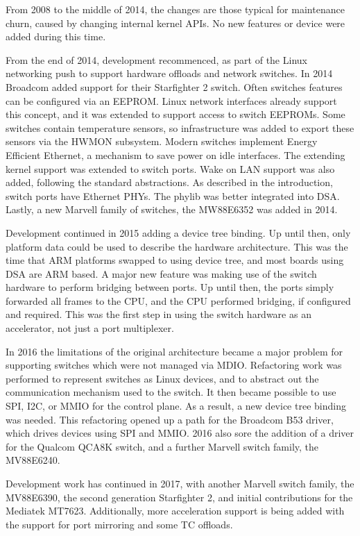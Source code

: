 \documentclass[letterpaper]{article}
\begin{document}
From 2008 to the middle of 2014, the changes are those typical for
maintenance churn, caused by changing internal kernel APIs. No new
features or device were added during this time.

From the end of 2014, development recommenced, as part of the Linux
networking push to support hardware offloads and network switches. In
2014 Broadcom added support for their Starfighter 2 switch. Often
switches features can be configured via an EEPROM. Linux network
interfaces already support this concept, and it was extended to
support access to switch EEPROMs. Some switches contain temperature
sensors, so infrastructure was added to export these sensors via the
HWMON subsystem. Modern switches implement Energy Efficient Ethernet,
a mechanism to save power on idle interfaces. The extending kernel
support was extended to switch ports. Wake on LAN support was also
added, following the standard abstractions. As described in the
introduction, switch ports have Ethernet PHYs. The phylib was better
integrated into DSA. Lastly, a new Marvell family of switches, the
MW88E6352 was added in 2014.

Development continued in 2015 adding a device tree binding. Up until
then, only platform data could be used to describe the hardware
architecture. This was the time that ARM platforms swapped to using
device tree, and most boards using DSA are ARM based. A major new
feature was making use of the switch hardware to perform bridging
between ports. Up until then, the ports simply forwarded all frames to
the CPU, and the CPU performed bridging, if configured and
required. This was the first step in using the switch hardware as an
accelerator, not just a port multiplexer.

In 2016 the limitations of the original architecture became a major
problem for supporting switches which were not managed via
MDIO. Refactoring work was performed to represent switches as Linux
devices, and to abstract out the communication mechanism used to the
switch. It then became possible to use SPI, I2C, or MMIO for the
control plane. As a result, a new device tree binding was needed. This
refactoring opened up a path for the Broadcom B53 driver, which drives
devices using SPI and MMIO. 2016 also sore the addition of a driver
for the Qualcom QCA8K switch, and a further Marvell switch family, the
MV88E6240.

Development work has continued in 2017, with another Marvell switch
family, the MV88E6390, the second generation Starfighter 2, and
initial contributions for the Mediatek MT7623. Additionally, more
acceleration support is being added with the support for port
mirroring and some TC offloads.
\end{document}

